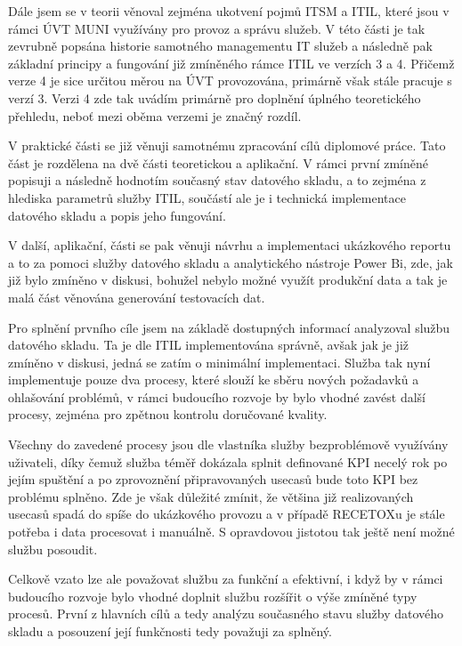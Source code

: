 \documentclass[
  digital,     %
  twoside,     %
  lof,         %
  lot,         %
]{fithesis4}
\begin{document}
Dále jsem se v teorii věnoval zejména ukotvení pojmů ITSM a ITIL, které jsou v rámci ÚVT MUNI využívány pro provoz a správu služeb. V této části je tak zevrubně popsána historie samotného managementu IT služeb a následně pak základní principy a fungování již zmíněného rámce ITIL ve verzích 3 a 4. Přičemž verze 4 je sice určitou měrou na ÚVT provozována, primárně však stále pracuje s verzí 3. Verzi 4 zde tak uvádím primárně pro doplnění úplného teoretického přehledu, neboť mezi oběma verzemi je značný rozdíl. 


V praktické části se již věnuji samotnému zpracování cílů diplomové práce. Tato část je rozdělena na dvě části teoretickou a aplikační. V rámci první zmíněné popisuji a následně hodnotím současný stav datového skladu, a to zejména z hlediska parametrů služby ITIL, součástí ale je i technická implementace datového skladu a popis jeho fungování. 

V další, aplikační, části se pak věnuji návrhu a implementaci ukázkového reportu a to za pomoci služby datového skladu a analytického nástroje Power Bi, zde, jak již bylo zmíněno v diskusi, bohužel nebylo možné využít produkční data a tak je malá část věnována generování testovacích dat.

Pro splnění prvního cíle jsem na základě dostupných informací analyzoval službu datového skladu. Ta je dle ITIL implementována správně, avšak jak je již zmíněno v diskusi, jedná se zatím o minimální implementaci.  Služba tak nyní implementuje pouze dva procesy, které slouží ke sběru nových požadavků a ohlašování problémů, v rámci budoucího rozvoje by bylo vhodné zavést další procesy, zejména pro zpětnou kontrolu doručované kvality. 

Všechny do zavedené procesy jsou dle vlastníka služby bezproblémově využívány uživateli, díky čemuž služba téměř dokázala splnit definované KPI necelý rok po jejím spuštění a po zprovoznění připravovaných usecasů bude toto KPI bez problému splněno. Zde je však důležité zmínit, že většina již realizovaných usecasů spadá do spíše do ukázkového provozu a v případě RECETOXu je stále potřeba i data procesovat i manuálně. S opravdovou jistotou tak ještě není možné službu posoudit.

Celkově vzato lze ale považovat službu za funkční a efektivní, i když by v rámci budoucího rozvoje bylo vhodné doplnit službu rozšířit o výše zmíněné typy procesů. První z hlavních cílů a tedy analýzu současného stavu služby datového skladu a posouzení její funkčnosti tedy považuji za splněný. 
\end{document}
